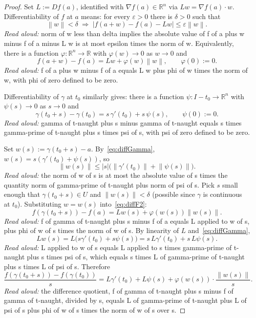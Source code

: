 \documentclass[11pt]{article}
\theoremstyle{definition}
\theoremstyle{remark}
\newcommand{\R}{\mathbb{R}}
\newcommand{\norm}[1]{\left\lVert #1 \right\rVert}
\newcommand{\grad}{\nabla}
\begin{document}
\begin{proof}
Set $L := Df(a)$, identified with $\grad f(a) \in \R^n$ via $L w = \grad f(a) \cdot w$. Differentiability of $f$ at $a$ means: for every $\varepsilon > 0$ there is $\delta > 0$ such that
\begin{equation}\label{eq:diffF}
\norm{w} < \delta \;\Longrightarrow\; \bigl| f(a + w) - f(a) - L w \bigr| \le \varepsilon \norm{w}.
\end{equation}
\emph{Read aloud:} norm of w less than delta implies the absolute value of f of a plus w minus f of a minus L w is at most epsilon times the norm of w.
Equivalently, there is a function $\varphi : \R^n \to \R$ with $\varphi(w) \to 0$ as $w \to 0$ and
\begin{equation}\label{eq:diffF2}
f(a + w) - f(a) = L w + \varphi(w) \norm{w}, \qquad \varphi(0) := 0.
\end{equation}
\emph{Read aloud:} f of a plus w minus f of a equals L w plus phi of w times the norm of w, with phi of zero defined to be zero.

Differentiability of $\gamma$ at $t_0$ similarly gives: there is a function $\psi : I - t_0 \to \R^n$ with $\psi(s) \to 0$ as $s \to 0$ and
\begin{equation}\label{eq:diffGamma}
\gamma(t_0 + s) - \gamma(t_0) = s \, \gamma'(t_0) + s \, \psi(s), \qquad \psi(0) := 0.
\end{equation}
\emph{Read aloud:} gamma of t-naught plus s minus gamma of t-naught equals s times gamma-prime of t-naught plus s times psi of s, with psi of zero defined to be zero.

Set $w(s) := \gamma(t_0 + s) - a$. By~\eqref{eq:diffGamma}, $w(s) = s(\gamma'(t_0) + \psi(s))$, so
\begin{equation}\label{eq:wbound}
\norm{w(s)} \le |s| \bigl( \norm{\gamma'(t_0)} + \norm{\psi(s)} \bigr).
\end{equation}
\emph{Read aloud:} the norm of w of s is at most the absolute value of s times the quantity norm of gamma-prime of t-naught plus norm of psi of s.
Pick $s$ small enough that $\gamma(t_0 + s) \in U$ and $\norm{w(s)} < \delta$ (possible since $\gamma$ is continuous at $t_0$). Substituting $w = w(s)$ into~\eqref{eq:diffF2}:
\[
f(\gamma(t_0+s)) - f(a) = L w(s) + \varphi(w(s)) \norm{w(s)}.
\]
\emph{Read aloud:} f of gamma of t-naught plus s minus f of a equals L applied to w of s, plus phi of w of s times the norm of w of s.
By linearity of $L$ and~\eqref{eq:diffGamma},
\[
L w(s) = L\bigl( s \gamma'(t_0) + s \psi(s) \bigr) = s \, L \gamma'(t_0) + s \, L \psi(s).
\]
\emph{Read aloud:} L applied to w of s equals L applied to s times gamma-prime of t-naught plus s times psi of s, which equals s times L of gamma-prime of t-naught plus s times L of psi of s.
Therefore
\begin{equation}\label{eq:combine}
\frac{f(\gamma(t_0+s)) - f(\gamma(t_0))}{s} = L \gamma'(t_0) + L \psi(s) + \varphi(w(s)) \cdot \frac{\norm{w(s)}}{s}.
\end{equation}
\emph{Read aloud:} the difference quotient, f of gamma of t-naught plus s minus f of gamma of t-naught, divided by s, equals L of gamma-prime of t-naught plus L of psi of s plus phi of w of s times the norm of w of s over s.


\end{proof}
\end{document}
